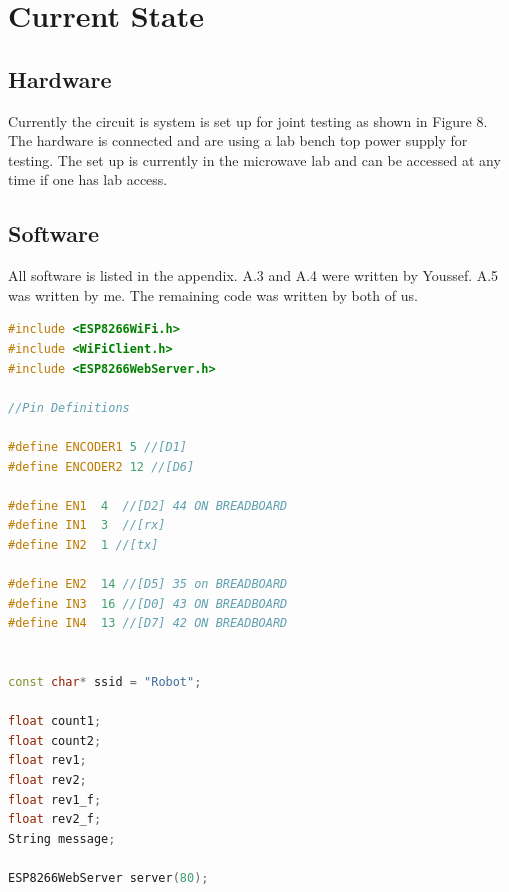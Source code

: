 \documentclass[conference]{IEEEtran}
\begin{document}
    \section{Current State}

    \subsection{Hardware}

    Currently the circuit is system is set up for joint testing as shown in Figure 8. The hardware is
    connected and are using a lab bench top power supply for testing. The set up is currently in the
    microwave lab and can be accessed at any time if one has lab access.
    
    \subsection{Software}

    All software is listed in the appendix. A.3 and A.4 were written by Youssef. A.5 was written by me.
    The remaining code was written by both of us.

    \newpage
    
    
    \appendix

\begin{lstlisting}[language=C++, caption=Initializaion Code]
#include <ESP8266WiFi.h>
#include <WiFiClient.h>
#include <ESP8266WebServer.h>

//Pin Definitions

#define ENCODER1 5 //[D1]
#define ENCODER2 12 //[D6]

#define EN1  4  //[D2] 44 ON BREADBOARD
#define IN1  3  //[rx]
#define IN2  1 //[tx]

#define EN2  14 //[D5] 35 on BREADBOARD
#define IN3  16 //[D0] 43 ON BREADBOARD
#define IN4  13 //[D7] 42 ON BREADBOARD 


const char* ssid = "Robot";

float count1;
float count2;
float rev1;
float rev2;
float rev1_f;
float rev2_f;
String message;

ESP8266WebServer server(80);\end{lstlisting}
\end{document}

